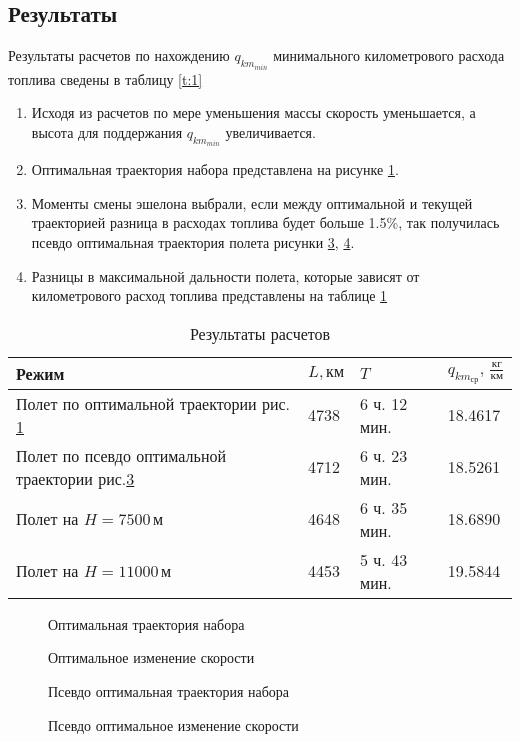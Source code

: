 \documentclass[bachelor,subf,14pt, substylefile = spbu.rtx]{disser}
\begin{document}
\subsection{Результаты}
Результаты расчетов по нахождению $q_{{km}_{min}}$ минимального километрового расхода топлива сведены в таблицу \ref{t:1}
\begin{enumerate}
\item Исходя из расчетов по мере уменьшения массы скорость уменьшается, а высота для поддержания $q_{{km}_{min}}$ увеличивается.
\item Оптимальная траектория набора представлена на рисунке \ref{fig:fig1}.
\item Моменты смены эшелона выбрали, если между оптимальной и текущей траекторией разница в расходах топлива будет больше 1.5\%, так получилась псевдо оптимальная траектория полета рисунки \ref{fig:fig2}, \ref{fig:fig4}.
\item Разницы в максимальной дальности полета, которые зависят от километрового расход топлива представлены на таблице \ref{tab:tab:opt_vs_const_h} 
\end{enumerate}

\begin{table}[H]
\centering
\begin{tabular}{|l|l|l|l|}
\hline
Режим & $L, км$ & $T$ & $q_{km_{ср}}, \, \frac{кг}{км}$\\
\hline
Полет по оптимальной траектории рис. \ref{fig:fig1}& 4738 & 6 ч. 12 мин. & 18.4617\\
\hline
Полет по псевдо оптимальной траектории рис.\ref{fig:fig2}& 4712 & 6 ч. 23 мин. & 18.5261\\
\hline
Полет на $H=7500\,м$ & 4648 & 6 ч. 35 мин.& 18.6890\\
\hline
Полет на $H=11000\,м$ & 4453 & 5 ч. 43 мин. & 19.5844\\
\hline
\end{tabular}
\caption{Результаты расчетов}
\label{tab:tab:opt_vs_const_h}
\end{table}


\begin{figure}[H]
\centering
\scalebox{0.8}{}
\caption{Оптимальная траектория набора}
\label{fig:fig1}
\end{figure}
\begin{figure}[H]
\centering
\scalebox{0.8}{}
\caption{Оптимальное изменение скорости}
\label{fig:fig3}
\end{figure}

\begin{figure}[H]
\centering
\scalebox{0.8}{}
\caption{Псевдо оптимальная траектория набора}
\label{fig:fig2}
\end{figure}
\begin{figure}[H]
\centering
\scalebox{0.8}{}
\caption{Псевдо оптимальное изменение скорости}
\label{fig:fig4}
\end{figure}

\begin{table}
\centering
\resizebox{\textwidth-5cm}{!}{
    
}
\caption{$q_{km}\, [\frac{кг}{км}], V \, [\frac{м}{с}] $}
\label{t:1}

\end{table}
\end{document}
